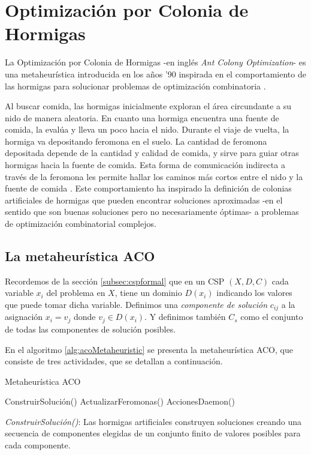 \documentclass{llncs}
\begin{document}
  \section{\textbf{Optimización por Colonia de Hormigas}}
  \label{sec:acor}
  La Optimización por Colonia de Hormigas -en inglés \textit{Ant Colony Optimization}- es una metaheurística introducida en los años '90 inspirada en el comportamiento de las hormigas
  para solucionar problemas de optimización combinatoria \cite{dor92,dor:man:col,dor:schu}.
  
  Al buscar comida, las hormigas inicialmente exploran el área circundante a su nido de manera aleatoria. En cuanto una hormiga encuentra una fuente de comida, la evalúa y lleva un poco hacia el nido. Durante el viaje de vuelta, la hormiga va depositando feromona en el suelo. La cantidad de feromona depositada depende de la cantidad y calidad de comida, y sirve para guiar otras hormigas hacia la fuente de comida. Esta forma de comunicación indirecta a través de la feromona  les permite hallar los caminos más cortos entre el nido y la fuente de comida \cite{gos:aro:den:pas}. Este comportamiento ha inspirado la definición de colonias artificiales de hormigas que pueden encontrar soluciones aproximadas -en el sentido que son buenas soluciones pero no necesariamente óptimas- a problemas de optimización combinatorial complejos.
  
  \subsection{La metaheurística ACO}
  	Recordemos de la sección \ref{subsec:cspformal} que en un CSP $(X, D, C)$ cada variable
 	 $x_i$ del problema en $X$, tiene un dominio $D(x_i)$ indicando los valores que puede tomar
  	dicha variable. Definimos una \textit{componente de solución} $c_{ij}$ a la asignación $x_i = v_j$ donde $v_j \in D(x_i)$. 
  	Y definimos también $C_s$ como el conjunto de todas las componentes de solución posibles.
  
  	En el algoritmo \ref{alg:acoMetaheuristic} se presenta la metaheurística ACO, que consiste de tres
  	actividades, que se detallan a continuación.
  	
  	\begin{algorithm}[H]
  	\caption{Metaheurística ACO}
  	\label{alg:acoMetaheuristic}
  	\begin{algorithmic}[1]
  		\State ConstruirSolución()
  		\State ActualizarFeromonas()
  		\State AccionesDaemon() 
  		\EndWhile
  	\end{algorithmic}
	\end{algorithm}
	\bigbreak
	\textit{ConstruirSolución()}: Las hormigas artificiales construyen soluciones creando una secuencia de componentes elegidas de un conjunto finito de valores posibles para cada componente. 
	
\end{document}
